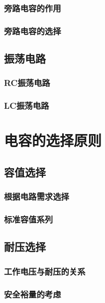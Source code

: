 \documentclass[12pt,UTF8]{ctexbook}
\begin{document}
\subsection{旁路电容的作用}

\subsection{旁路电容的选择}

\section{振荡电路}

\subsection{RC振荡电路}

\subsection{LC振荡电路}

\chapter{电容的选择原则}

\section{容值选择}

\subsection{根据电路需求选择}

\subsection{标准容值系列}

\section{耐压选择}

\subsection{工作电压与耐压的关系}

\subsection{安全裕量的考虑}
\end{document}
